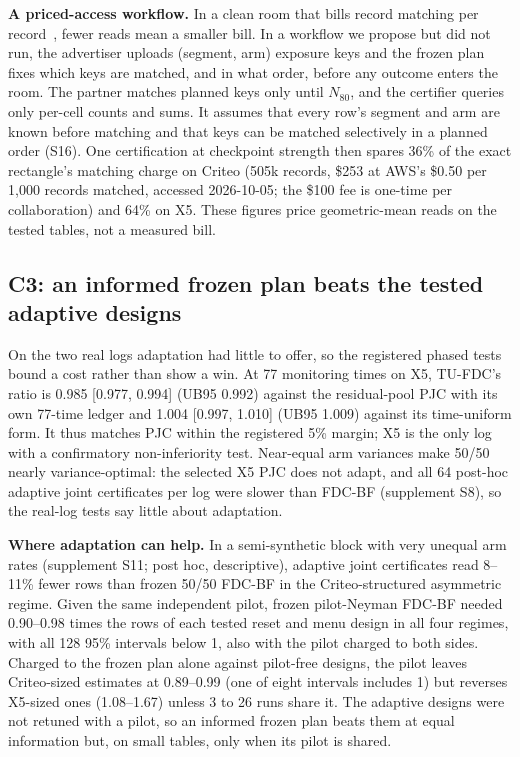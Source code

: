 \documentclass[sigconf,anonymous,review]{acmart}
\begin{document}
\textbf{A priced-access workflow.} In a clean room that bills record matching per record~\citep{awscleanrooms2026pricing}, fewer reads mean a smaller bill. In a workflow we propose but did not run, the advertiser uploads (segment, arm) exposure keys and the frozen plan fixes which keys are matched, and in what order, before any outcome enters the room. The partner matches planned keys only until $N_{80}$, and the certifier queries only per-cell counts and sums. It assumes that every row's segment and arm are known before matching and that keys can be matched selectively in a planned order (S16). One certification at checkpoint strength then spares 36\% of the exact rectangle's matching charge on Criteo (505k records, \$253 at AWS's \$0.50 per 1,000 records matched, accessed 2026-10-05; the \$100 fee is one-time per collaboration) and 64\% on X5. These figures price geometric-mean reads on the tested tables, not a measured bill.

\subsection{C3: an informed frozen plan beats the tested adaptive designs}\label{sec:c3}

On the two real logs adaptation had little to offer, so the registered phased tests bound a cost rather than show a win. At 77 monitoring times on X5, TU-FDC's ratio is 0.985 [0.977, 0.994] (UB95 0.992) against the residual-pool PJC with its own 77-time ledger and 1.004 [0.997, 1.010] (UB95 1.009) against its time-uniform form. It thus matches PJC within the registered 5\% margin; X5 is the only log with a confirmatory non-inferiority test. Near-equal arm variances make 50/50 nearly variance-optimal: the selected X5 PJC does not adapt, and all 64 post-hoc adaptive joint certificates per log were slower than FDC-BF (supplement S8), so the real-log tests say little about adaptation.

\textbf{Where adaptation can help.} In a semi-synthetic block with very unequal arm rates (supplement S11; post hoc, descriptive), adaptive joint certificates read 8--11\% fewer rows than frozen 50/50 FDC-BF in the Criteo-structured asymmetric regime. Given the same independent pilot, frozen pilot-Neyman FDC-BF needed 0.90--0.98 times the rows of each tested reset and menu design in all four regimes, with all 128 95\% intervals below 1, also with the pilot charged to both sides. Charged to the frozen plan alone against pilot-free designs, the pilot leaves Criteo-sized estimates at 0.89--0.99 (one of eight intervals includes 1) but reverses X5-sized ones (1.08--1.67) unless 3 to 26 runs share it. The adaptive designs were not retuned with a pilot, so an informed frozen plan beats them at equal information but, on small tables, only when its pilot is shared.
\end{document}
